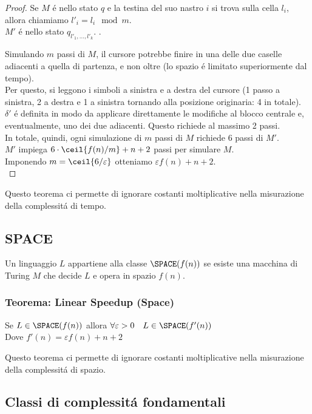 \begin{proof}
Se $M$ é nello stato $q$ e la testina del suo nastro $i$ si trova sulla cella $l_i$, allora chiamiamo ${l'}_i = l_i \mod m$. \\
$M'$ é nello stato $q_{l'_1, \ldots, l'_k}$. .

Simulando $m$ passi di $M$, il cursore potrebbe finire in una delle due caselle adiacenti a quella di partenza, e non oltre (lo spazio é limitato superiormente dal tempo).\\
Per questo, si leggono i simboli a sinistra e a destra del cursore (1 passo a sinistra, 2 a destra e 1 a sinistra tornando alla posizione originaria: 4 in totale). \\
$\delta'$ é definita in modo da applicare direttamente le modifiche al blocco centrale e, eventualmente, uno dei due adiacenti. Questo richiede al massimo 2 passi. \\

In totale, quindi, ogni simulazione di $m$ passi di $M$ richiede $6$ passi di $M'$. \\
$M'$ impiega $6 \cdot \ceil{f(n)/m} + n + 2$ passi per simulare $M$. \\
Imponendo $m = \ceil{6/\varepsilon}$ otteniamo $\varepsilon f(n) + n + 2$. \\

\end{proof}

Questo teorema ci permette di ignorare costanti moltiplicative nella misurazione della complessitá di tempo.


\subsection{SPACE}
Un linguaggio $L$ appartiene alla classe $\SPACE(f(n))$ se esiste una macchina di Turing $M$ che decide $L$ e opera in spazio $f(n)$.

\subsubsection{Teorema: Linear Speedup (Space)}
Se $L \in \SPACE(f(n))$ allora $\forall \varepsilon > 0 \quad L \in \SPACE(f'(n))$ \\
Dove $f'(n) = \varepsilon f(n) + n + 2$

Questo teorema ci permette di ignorare costanti moltiplicative nella misurazione della complessitá di spazio.

\subsection{Classi di complessitá fondamentali}

